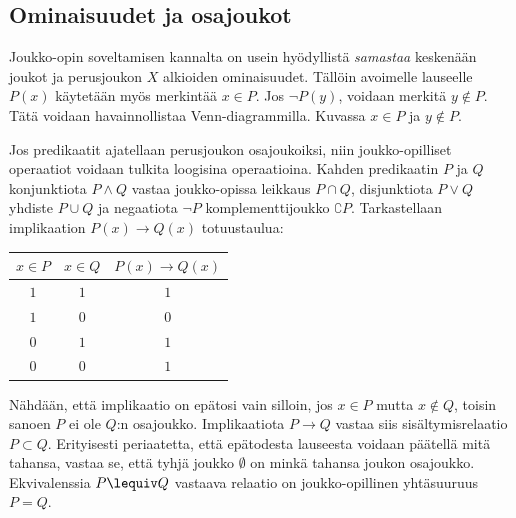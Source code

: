 \subsection*{Ominaisuudet ja osajoukot}
Jouk\-ko-opin soveltamisen kannalta on usein hyödyllistä {\em samastaa} keskenään joukot ja perusjoukon $X$ alkioiden ominaisuudet. Tällöin avoimelle lauseelle $P(x)$ käytetään myös merkintää $x\in P$. Jos $\lnot P(y)$, voidaan merkitä $y\notin P$. Tätä voidaan havainnollistaa Venn-diagrammilla. Kuvassa $x\in P$ ja $y\notin P$.

\begin{center}




\end{center}

Jos predikaatit ajatellaan perusjoukon osajoukoiksi, niin joukko-opil\-li\-set operaatiot voidaan tulkita loogisina operaatioina. Kahden predikaatin $P$ ja $Q$ konjunktiota $P\land Q$ vastaa joukko-opissa leikkaus $P\cap Q$, disjunktiota $P \lor Q$ yhdiste $P\cup Q$ ja negaatiota $\lnot P$ komplementtijoukko $\complement P$. 
Tarkastellaan implikaation $P(x)\to Q(x)$ totuustaulua:

\bigskip

\begin{center}
\begin{tabular}{|c|c|c|}\hline
$x\in P$ & $x \in Q$ & $P(x) \to Q(x)$ \\ \hline
$1$ & $1$ & $1$\\ %
$1$ & $0$ & $0$\\
$0$ & $1$ & $1$\\
$0$ & $0$ & $1$\\ \hline
\end{tabular}
\end{center}

\bigskip

Nähdään, että implikaatio on epätosi vain silloin, jos $x \in P$ mutta $x\not \in Q$, toisin sanoen $P$ ei ole $Q$:n osajoukko. Implikaatiota $P \to Q$ vastaa siis sisältymisrelaatio $P \subset Q$. Erityisesti periaatetta, että epätodesta lauseesta voidaan päätellä mitä tahansa, vastaa se, että tyhjä joukko $\emptyset$ on minkä tahansa joukon osajoukko. Ekvivalenssia $P\lequiv Q$ vastaava relaatio on joukko-opillinen yhtäsuuruus $P=Q$.

